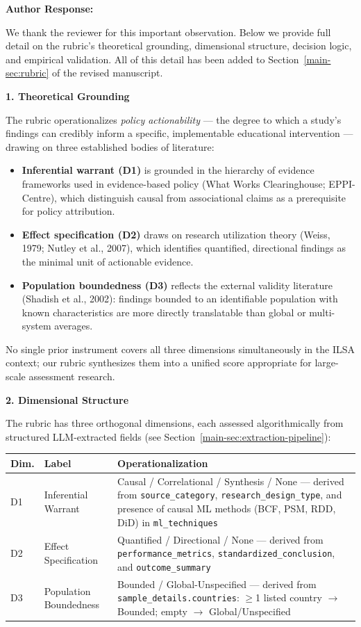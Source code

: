 \documentclass[12pt, a4paper]{article}
\newcommand{\R}[1]{Section~\ref{main-#1}}
\newenvironment{authorresponse}{%
  \begin{mdframed}[linecolor=authorcolor, linewidth=1pt,
    backgroundcolor=authorcolor!5, innertopmargin=8pt, innerbottommargin=8pt]
  \color{authorcolor}\textbf{Author Response:}\normalcolor\par\smallskip
}{%
  \end{mdframed}\bigskip
}
\begin{document}
\begin{authorresponse}
We thank the reviewer for this important observation. Below we provide full
detail on the rubric's theoretical grounding, dimensional structure,
decision logic, and empirical validation. All of this detail has been added
to \R{sec:rubric} of the revised manuscript.

\medskip
\noindent\textbf{1. Theoretical Grounding}

The rubric operationalizes \textit{policy actionability} --- the degree to
which a study's findings can credibly inform a specific, implementable
educational intervention --- drawing on three established bodies of
literature:
\begin{itemize}[leftmargin=*]
  \item \textbf{Inferential warrant (D1)} is grounded in the hierarchy of
    evidence frameworks used in evidence-based policy (What Works
    Clearinghouse; EPPI-Centre), which distinguish causal from associational
    claims as a prerequisite for policy attribution.
  \item \textbf{Effect specification (D2)} draws on research utilization
    theory (Weiss, 1979; Nutley et al., 2007), which identifies quantified,
    directional findings as the minimal unit of actionable evidence.
  \item \textbf{Population boundedness (D3)} reflects the external validity
    literature (Shadish et al., 2002): findings bounded to an identifiable
    population with known characteristics are more directly translatable
    than global or multi-system averages.
\end{itemize}

No single prior instrument covers all three dimensions simultaneously in
the ILSA context; our rubric synthesizes them into a unified score
appropriate for large-scale assessment research.

\medskip
\noindent\textbf{2. Dimensional Structure}

The rubric has three orthogonal dimensions, each assessed algorithmically
from structured LLM-extracted fields (see \R{sec:extraction-pipeline}):

\smallskip
\begin{tabular}{@{}llp{7cm}@{}}
\toprule
\textbf{Dim.} & \textbf{Label} & \textbf{Operationalization} \\
\midrule
D1 & Inferential Warrant &
  Causal / Correlational / Synthesis / None --- derived from
  \texttt{source\_category}, \texttt{research\_design\_type}, and
  presence of causal ML methods (BCF, PSM, RDD, DiD) in
  \texttt{ml\_techniques} \\
D2 & Effect Specification &
  Quantified / Directional / None --- derived from
  \texttt{performance\_metrics}, \texttt{standardized\_conclusion},
  and \texttt{outcome\_summary} \\
D3 & Population Boundedness &
  Bounded / Global-Unspecified --- derived from
  \texttt{sample\_details.countries}: $\geq$1 listed country $\to$
  Bounded; empty $\to$ Global/Unspecified \\
\bottomrule
\end{tabular}


\end{authorresponse}
\end{document}
